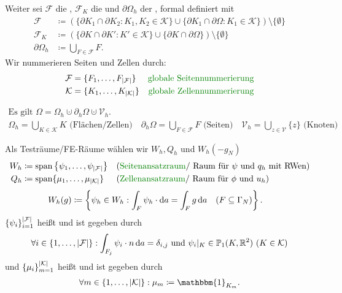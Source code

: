 Weiter sei $ \mathcal{F} $ die , $ \mathcal{F}_K $ die  und $ \partial \Omega_h $ der , formal definiert mit
\begin{align*}
	\mathcal{F} &\coloneqq \left( \{ \partial K_1 \cap \partial K_2 : K_1,K_2 \in \mathcal{K} \} \cup \{ \partial K_1 \cap \partial \Omega : K_1 \in \mathcal{K}\} \right) \setminus \{ \emptyset \} \\
	\mathcal{F}_K &\coloneqq \left( \{ \partial K \cap \partial K' : K' \in \mathcal{K} \} \cup \{ \partial K \cap \partial \Omega\} \right) \setminus \{ \emptyset \} \\
	\partial \Omega_h &\coloneqq \bigcup_{F \in \mathcal{F}} F.
\end{align*}
Wir nummerieren Seiten und Zellen durch:
\begin{align*}
	\mathcal{F} &= \{F_1, \dots , F_{\abs{\mathcal{F}}} \} &\text{\defi{globale Seitennummerierung}} \\
	\mathcal{K} &= \{K_1, \dots , K_{\abs{\mathcal{K}}} \} &\text{\defi{globale Zellennummerierung}} 
\end{align*}
\begin{remark}
	\begin{gather*}
	\text{Es gilt }\Omega = \Omega_h \cupdot \partial_h\Omega \cupdot \mathcal{V}_h. \\
	\Omega_h = \bigcup_{K \in \mathcal{K}} K \text{ (Flächen/Zellen)}\quad \partial_h\Omega = \bigcup_{F \in \mathcal{F}} F \text{ (Seiten)}\quad \mathcal{V}_h = \bigcup_{z \in \mathcal{V}}\{ z \} \text{ (Knoten)}	
	\end{gather*}
\end{remark}
\begin{define}
	Als Testräume/FE-Räume wählen wir $ W_h, Q_h $ und $ W_h(-g_N) $
	\begin{align*}
		W_h &\coloneqq \spann \left\{ \psi_1, \dots , \psi_{\abs{\mathcal{F}}}  \right\} &&\text{(\defi{Seitenansatzraum}/ Raum für $ \psi $ und $ q_h $ mit RWen)}\\
		Q_h &\coloneqq \spann \{ \mu_1, \dots , \mu_{\abs{\mathcal{K}}} \} &&\text{(\defi{Zellenansatzraum}/ Raum für $ \phi $ und $ u_h $)}
	\end{align*}
	\begin{align*}
		W_h(g) &\coloneqq \left\{ \psi_h \in W_h: \int_F \psi_h \cdot \mathop{}\!\mathrm{d} a = \int_F g \mathop{}\!\mathrm{d} a \quad (F \subseteq \Gamma_N) \right\}.
	\end{align*}
	$ \{ \psi_i \}_{i=1}^{\abs{\mathcal{F}}} $ heißt  und ist gegeben durch 
	\begin{align*}
		\forall i \in \{1, \dots , \abs{\mathcal{F}} \} : \int_{F_j} \psi_i \cdot n \mathop{}\!\mathrm{d} a = \delta_{i,j} \text{ und }  \psi_i|_K \in \mathbb{P}_1(K,\mathbb{R}^2) \ (K \in \mathcal{K}) 
	\end{align*}
	und  $ \{ \mu_i \}_{m=1}^{\abs{\mathcal{K}}} $ heißt  und ist gegeben durch
	\begin{align*}
		\forall m \in \{1, \dots , \abs{\mathcal{K}} \} : \mu_m \coloneqq  \mathbbm{1}_{K_m}.
	\end{align*}
\end{define}

